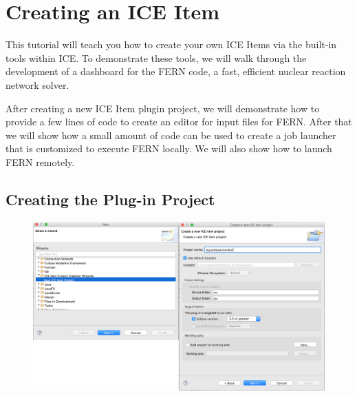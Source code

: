\section{Creating an ICE Item} 

This tutorial will teach you how to
create your own ICE Items via the built-in tools within ICE.  To demonstrate
these tools, we will walk through the development of a dashboard for the
FERN code, a fast, efficient nuclear reaction network solver. 

After creating a new ICE Item plugin project, we will demonstrate how to
provide a few lines of code to create an editor for
input files for FERN. After that we will show how a small amount of code can be
used to create a job launcher that is customized to execute FERN locally. We
will also show how to launch FERN remotely.

\subsection{Creating the Plug-in Project}

\begin{figure}[h]
\centering
\includegraphics[width=\textwidth]{figures/comb12.png}
\label{fig:comb12}
\end{figure}

